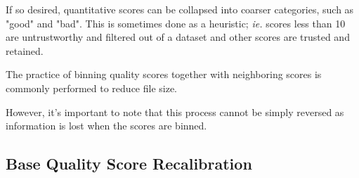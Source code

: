 \documentclass{article}
\begin{document}
\begin{outline}
\begin{outline}
		\item If so desired, quantitative scores can be collapsed into coarser categories, such as "good" and "bad". This is sometimes done as a heuristic; \textit{ie.} scores less than 10 are untrustworthy and filtered out of a dataset and other scores are trusted and retained.
		\item The practice of binning quality scores together with neighboring scores is commonly performed to reduce file size. %
		\item However, it's important to note that this process cannot be simply reversed as information is lost when the scores are binned.
	\end{outline}
\end{outline}

\subsection{Base Quality Score Recalibration}
\end{document}
